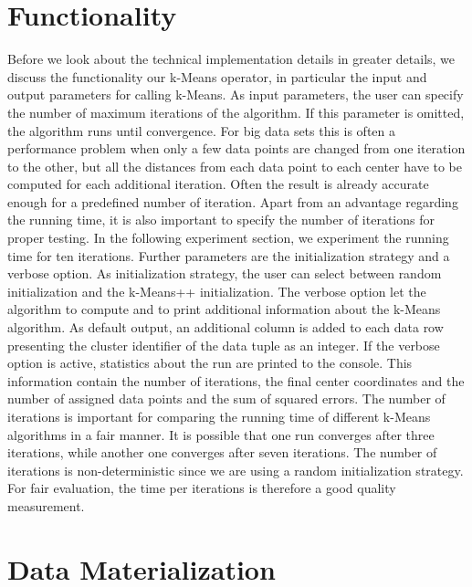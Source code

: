 \section{Functionality}
Before we look about the technical implementation details in greater details, we discuss the functionality our k-Means operator, in particular the input and output parameters for calling k-Means. 
As input parameters, the user can specify the number of maximum iterations of the algorithm. If this parameter is omitted, the algorithm runs until convergence. For big data sets this is often a performance problem when only a few data points are changed from one iteration to the other, but all the distances from each data point to each center have to be computed for each additional iteration. Often the result is already accurate enough for a predefined number of iteration. Apart from an advantage regarding the running time, it is also important to specify the number of iterations for proper testing. In the following experiment section, we experiment the running time for ten iterations.
Further parameters are the initialization strategy and a verbose option. As initialization strategy, the user can select between random initialization and the k-Means++ initialization. The verbose option let the algorithm to compute and to print additional information about the k-Means algorithm.
As default output, an additional column is added to each data row presenting the cluster identifier of the data tuple as an integer. If the verbose option is active, statistics about the run are printed to the console. This information contain the number of iterations, the final center coordinates and the number of assigned data points and the sum of squared errors. 
The number of iterations is  important for comparing the running time of different k-Means algorithms in a fair manner. It is possible that one run converges after three iterations, while another one converges after seven iterations. The number of iterations is non-deterministic since we are using a random initialization strategy. For fair evaluation, the time per iterations is therefore a good quality measurement.



\section{Data Materialization}

